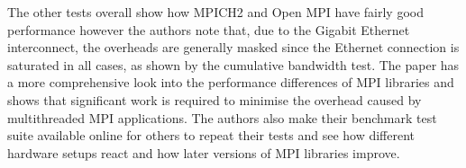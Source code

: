 The other tests overall show how MPICH2 and Open MPI have fairly good
performance however the authors note that, due to the Gigabit Ethernet
interconnect, the overheads are generally masked since the Ethernet connection
is saturated in all cases, as shown by the cumulative bandwidth test. The paper
has a more comprehensive look into the performance differences of MPI libraries
and shows that significant work is required to minimise the overhead caused by
multithreaded MPI applications. The authors also make their benchmark test suite
available online for others to repeat their tests and see how different hardware
setups react and how later versions of MPI libraries improve.
